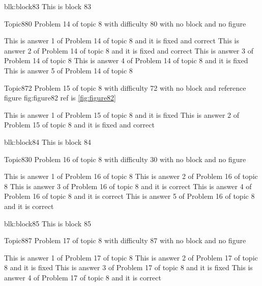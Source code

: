 \documentclass[master]{exam}
\begin{document}
\begin{block}{blk:block83}
This is block 83
\end{block}


\begin{problem}{Topic8}{80}
	Problem 14 of topic 8 with difficulty 80 with no block and no figure
	\begin{answers}
		 This is answer 1 of Problem 14 of topic 8 and it is fixed and correct
		 This is answer 2 of Problem 14 of topic 8 and it is fixed and correct
		\answer This is answer 3 of Problem 14 of topic 8 
		\answer[fixed] This is answer 4 of Problem 14 of topic 8 and it is fixed
		\answer This is answer 5 of Problem 14 of topic 8 
	\end{answers}
\end{problem}

\begin{problem}{Topic8}{72}
	Problem 15 of topic 8 with difficulty 72 with no block and reference figure fig:figure82 ref is \ref{fig:figure82}
	\begin{answers}
		\answer[fixed] This is answer 1 of Problem 15 of topic 8 and it is fixed
		 This is answer 2 of Problem 15 of topic 8 and it is fixed and correct
	\end{answers}
\end{problem}



\begin{block}{blk:block84}
This is block 84
\end{block}


\begin{problem}{Topic8}{30}
	Problem 16 of topic 8 with difficulty 30 with no block and no figure
	\begin{answers}
		\answer This is answer 1 of Problem 16 of topic 8 
		\answer This is answer 2 of Problem 16 of topic 8 
		\answer[correct] This is answer 3 of Problem 16 of topic 8 and it is correct
		\answer[correct] This is answer 4 of Problem 16 of topic 8 and it is correct
		\answer[correct] This is answer 5 of Problem 16 of topic 8 and it is correct
	\end{answers}
\end{problem}



\begin{block}{blk:block85}
This is block 85
\end{block}


\begin{problem}{Topic8}{87}
	Problem 17 of topic 8 with difficulty 87 with no block and no figure
	\begin{answers}
		\answer This is answer 1 of Problem 17 of topic 8 
		\answer[fixed] This is answer 2 of Problem 17 of topic 8 and it is fixed
		\answer[fixed] This is answer 3 of Problem 17 of topic 8 and it is fixed
		\answer[correct] This is answer 4 of Problem 17 of topic 8 and it is correct
	\end{answers}
\end{problem}
\end{document}
